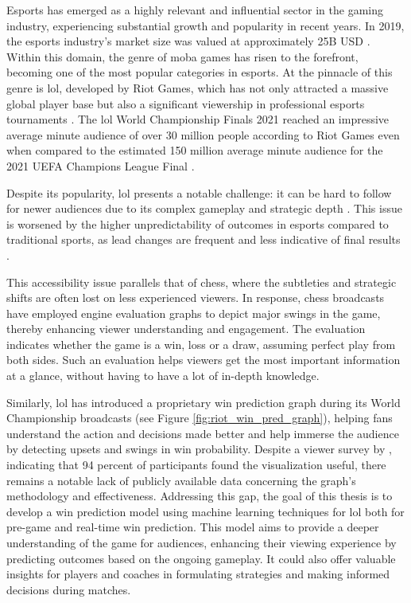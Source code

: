 \documentclass[12pt, a4paper, headinclude, twoside, plainheadsepline, open=right, numbers=noenddot, hidelinks, toc=listof, toc=bibliography]{scrreprt}
\begin{document}
Esports has emerged as a highly relevant and influential sector in the gaming industry, experiencing substantial growth and popularity in recent years. 
In 2019, the esports industry's market size was valued at approximately 25B USD \cite{ahnOneBillionDollar2020}.
Within this domain, the genre of \ac{moba} games has risen to the forefront, becoming one of the most popular categories in esports. 
At the pinnacle of this genre is \ac{lol}, developed by Riot Games, which has not only attracted a massive global player base but also a significant viewership in professional esports tournaments \cite{goughLeagueLegendsChampionships}. 
The \acl{lol} World Championship Finals 2021 reached an impressive average minute audience of over 30 million people according to Riot Games \cite{riotgamesHowRiotEsports2022} even when compared to the estimated 150 million average minute audience for the 2021 UEFA Champions League Final \cite{dalmiaChampionsLeagueFinal2023}.

Despite its popularity, \ac{lol} presents a notable challenge: it can be hard to follow for newer audiences due to its complex gameplay and strategic depth \cite{campbell2021sports}.  
This issue is worsened by the higher unpredictability of outcomes in esports compared to traditional sports, as lead changes are frequent and less indicative of final results \cite{campbell2021sports}.

This accessibility issue parallels that of chess, where the subtleties and strategic shifts are often lost on less experienced viewers. 
In response, chess broadcasts have employed engine evaluation graphs to depict major swings in the game, thereby enhancing viewer understanding and engagement.
The evaluation indicates whether the game is a win, loss or a draw, assuming perfect play from both sides.
Such an evaluation helps viewers get the most important information at a glance, without having to have a lot of in-depth knowledge.

Similarly, \ac{lol} has introduced a proprietary win prediction graph during its World Championship broadcasts (see Figure \ref{fig:riot_win_pred_graph}), helping fans understand the action and decisions made better and help immerse the audience by detecting upsets and swings in win probability.
Despite a viewer survey by \citeauthor{claytorRiotGamesAWS2023} \cite{claytorRiotGamesAWS2023}, indicating that 94 percent of participants found the visualization useful, there remains a notable lack of publicly available data concerning the graph's methodology and effectiveness.
Addressing this gap, the goal of this thesis is to develop a win prediction model using machine learning techniques for \acl{lol} both for pre-game and real-time win prediction.
This model aims to provide a deeper understanding of the game for audiences, enhancing their viewing experience by predicting outcomes based on the ongoing gameplay. 
It could also offer valuable insights for players and coaches in formulating strategies and making informed decisions during matches.
\end{document}
